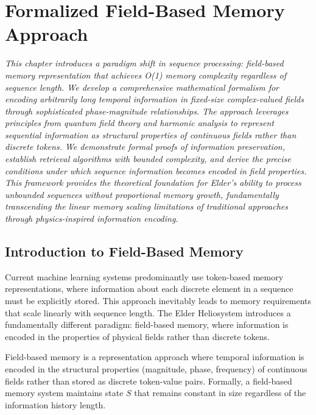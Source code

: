 \chapter{Formalized Field-Based Memory Approach}

\textit{This chapter introduces a paradigm shift in sequence processing: field-based memory representation that achieves O(1) memory complexity regardless of sequence length. We develop a comprehensive mathematical formalism for encoding arbitrarily long temporal information in fixed-size complex-valued fields through sophisticated phase-magnitude relationships. The approach leverages principles from quantum field theory and harmonic analysis to represent sequential information as structural properties of continuous fields rather than discrete tokens. We demonstrate formal proofs of information preservation, establish retrieval algorithms with bounded complexity, and derive the precise conditions under which sequence information becomes encoded in field properties. This framework provides the theoretical foundation for Elder's ability to process unbounded sequences without proportional memory growth, fundamentally transcending the linear memory scaling limitations of traditional approaches through physics-inspired information encoding.}

\section{Introduction to Field-Based Memory}

Current machine learning systems predominantly use token-based memory representations, where information about each discrete element in a sequence must be explicitly stored. This approach inevitably leads to memory requirements that scale linearly with sequence length. The Elder Heliosystem introduces a fundamentally different paradigm: field-based memory, where information is encoded in the properties of physical fields rather than discrete tokens.

\begin{definition}
Field-based memory is a representation approach where temporal information is encoded in the structural properties (magnitude, phase, frequency) of continuous fields rather than stored as discrete token-value pairs. Formally, a field-based memory system maintains state $S$ that remains constant in size regardless of the information history length.
\end{definition}

